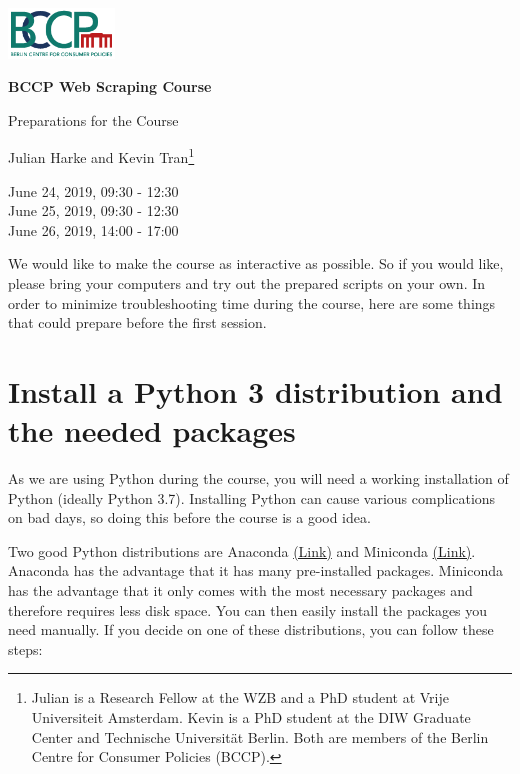 \documentclass[a4paper]{article}
\begin{document}
\includegraphics[width=80pt]{../misc/bccp_logo_transparent.png}
\vspace{1cm}

\begin{center}
\textbf{\Large BCCP Web Scraping Course}

{\large Preparations for the Course}
\vspace{0.3cm}

Julian Harke and Kevin Tran\footnote{Julian is a Research Fellow at the WZB and a PhD student at Vrije Universiteit Amsterdam. Kevin is a PhD student at the DIW Graduate Center and Technische Universit\"at Berlin. Both are members of the Berlin Centre for Consumer Policies (BCCP).} \vspace{0.3cm}

June 24, 2019, 09:30 - 12:30 \\
June 25, 2019, 09:30 - 12:30 \\
June 26, 2019, 14:00 - 17:00
\end{center}

We would like to make the course as interactive as possible. So if you would like, please bring your computers and try out the prepared scripts on your own. In order to minimize troubleshooting time during the course, here are some things that could prepare before the first session.

\section{Install a Python 3 distribution and the needed packages}

As we are using Python during the course, you will need a working installation of Python (ideally Python 3.7). Installing Python can cause various complications on bad days, so doing this before the course is a good idea.

Two good Python distributions are Anaconda \href{https://www.anaconda.com/distribution/}{(Link)} and Miniconda \href{https://docs.conda.io/en/latest/miniconda.html}{(Link)}. Anaconda has the advantage that it has many pre-installed packages. Miniconda has the advantage that it only comes with the most necessary packages and therefore requires less disk space. You can then easily install the packages you need manually. If you decide on one of these distributions, you can follow these steps:
\end{document}
